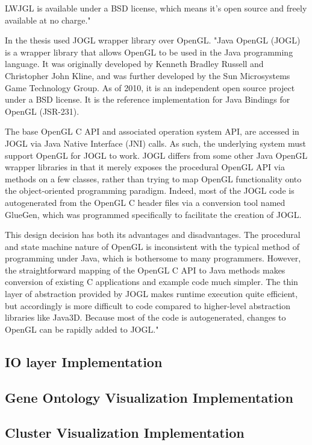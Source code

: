\documentclass[a4paper,oneside]{article}
\begin{document}
LWJGL is available under a BSD license, which means it's open source and freely available at no charge."~\cite{LWJGL}


In the thesis used JOGL wrapper library over OpenGL. "Java OpenGL (JOGL) is a wrapper library that allows OpenGL to be used in the Java programming language. It was originally developed by Kenneth Bradley Russell and Christopher John Kline, and was further developed by the Sun Microsystems Game Technology Group. As of 2010, it is an independent open source project under a BSD license. It is the reference implementation for Java Bindings for OpenGL (JSR-231).


The base OpenGL C API and associated operation system API, are accessed in JOGL via Java Native Interface (JNI) calls. As such, the underlying system must support OpenGL for JOGL to work. JOGL differs from some other Java OpenGL wrapper libraries in that it merely exposes the procedural OpenGL API via methods on a few classes, rather than trying to map OpenGL functionality onto the object-oriented programming paradigm. Indeed, most of the JOGL code is autogenerated from the OpenGL C header files via a conversion tool named GlueGen, which was programmed specifically to facilitate the creation of JOGL.


This design decision has both its advantages and disadvantages. The procedural and state machine nature of OpenGL is inconsistent with the typical method of programming under Java, which is bothersome to many programmers. However, the straightforward mapping of the OpenGL C API to Java methods makes conversion of existing C applications and example code much simpler. The thin layer of abstraction provided by JOGL makes runtime execution quite efficient, but accordingly is more difficult to code compared to higher-level abstraction libraries like Java3D. Because most of the code is autogenerated, changes to OpenGL can be rapidly added to JOGL."~\cite{JOGL}


\subsection{IO layer Implementation}

\subsection{Gene Ontology Visualization Implementation}
\subsection{Cluster Visualization Implementation}
	
\end{document}
